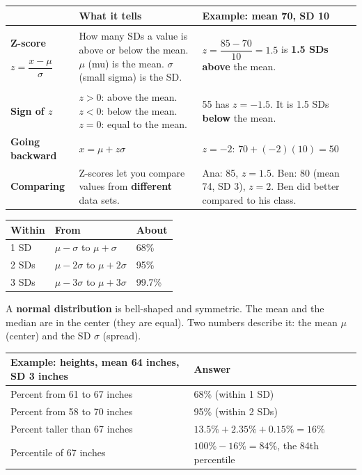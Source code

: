 \documentclass[11pt]{article}
\newcommand{\sumhead}[1]{\par\vspace{0.35em}{\large\bfseries #1}\par\vspace{0.15em}}
\newcommand{\tall}{\rule[-0.85em]{0pt}{2.2em}}
\begin{document}
\newpage
\sumhead{Z-Scores}
\begin{tabular}{|L{1.2in}|L{2.75in}|L{2.5in}|}\hline
 & \textbf{What it tells} & \textbf{Example: mean 70, SD 10}\\ \hline
\textbf{Z-score}\newline \tall$z = \dfrac{x - \mu}{\sigma}$ &
How many SDs a value is above or below the mean. $\mu$ (mu) is the mean. $\sigma$ (small sigma) is the SD. &
\tall$z = \dfrac{85 - 70}{10} = 1.5$ is \textbf{1.5 SDs above} the mean.\\ \hline
\textbf{Sign of $z$} & $z > 0$: above the mean. \newline $z < 0$: below the mean. \; $z = 0$: equal to the mean. &
55 has $z = -1.5$. It is 1.5 SDs \textbf{below} the mean.\\ \hline
\textbf{Going backward} & $x = \mu + z\sigma$ & $z = -2$: \; $70 + (-2)(10) = 50$\\ \hline
\textbf{Comparing} & Z-scores let you compare values from \textbf{different} data sets. &
Ana: 85, $z = 1.5$. Ben: 80 (mean 74, SD 3), $z = 2$. Ben did better compared to his class.\\ \hline
\end{tabular}

\sumhead{Normal Distributions and the Empirical Rule}
\begin{minipage}[c]{3.3in}\centering
{}
\end{minipage}\hfill
\begin{minipage}[c]{3.45in}\raggedright
\begin{tabular}{|L{0.6in}|L{1.5in}|L{0.6in}|}\hline
\textbf{Within} & \textbf{From} & \textbf{About}\\  SD & $\mu - \sigma$ to $\mu + \sigma$ & 68\%\\  SDs & $\mu - 2\sigma$ to $\mu + 2\sigma$ & 95\%\\  SDs & $\mu - 3\sigma$ to $\mu + 3\sigma$ & 99.7\%\\ \hline
\end{tabular}

\vspace{0.3em}
A \textbf{normal distribution} is bell-shaped and symmetric. The mean and the median are in the center (they are equal). Two numbers describe it: the mean $\mu$ (center) and the SD $\sigma$ (spread).
\end{minipage}

\vspace{0.3em}
\begin{tabular}{|L{3.75in}|L{2.9in}|}\hline
\textbf{Example: heights, mean 64 inches, SD 3 inches} & \textbf{Answer}\\ \hline
Percent from 61 to 67 inches & 68\% (within 1 SD)\\ \hline
Percent from 58 to 70 inches & 95\% (within 2 SDs)\\ \hline
Percent taller than 67 inches & $13.5\% + 2.35\% + 0.15\% = 16\%$\\ \hline
Percentile of 67 inches & $100\% - 16\% = 84\%$, the 84th percentile\\ \hline
\end{tabular}
\end{document}
